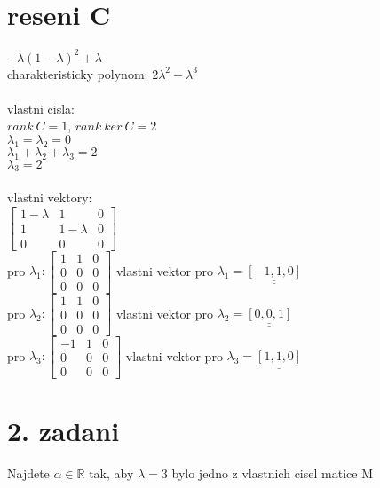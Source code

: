 \documentclass[a4paper]{article}
\def\doubleunderline#1{\underline{\underline{#1}}}
\begin{document}
\section*{reseni C}
$-\lambda(1-\lambda)^{2}+\lambda$\\
charakteristicky polynom: \doubleunderline{$2\lambda^2-\lambda^3$}\\
\\
vlastni cisla:\\
$rank~C = 1$, $rank~ker~C = 2$\\
\doubleunderline{$\lambda_1 = \lambda_2 = 0$}\\
$\lambda_1 + \lambda_2 + \lambda_3 = 2$\\
\doubleunderline{$\lambda_3 = 2$}\\
\\
vlastni vektory:\\
$
\left[\begin{matrix}
	1-\lambda & 1 & 0\\
	1 & 1-\lambda & 0\\
	0 & 0 & 0
	\end{matrix}\right]
$\\
pro $\lambda_1: \left[\begin{matrix}
	1 & 1 & 0\\
	0 & 0 & 0\\
	0 & 0 & 0
	\end{matrix}\right]$
vlastni vektor pro $\lambda_1 = \doubleunderline{[-1,1,0]}$\\
pro $\lambda_2: \left[\begin{matrix}
	1 & 1 & 0\\
	0 & 0 & 0\\
	0 & 0 & 0
	\end{matrix}\right]$
vlastni vektor pro $\lambda_2 = \doubleunderline{[0,0,1]}$\\
pro $\lambda_3: \left[\begin{matrix}
	-1 & 1 & 0\\
	0 & 0 & 0\\
	0 & 0 & 0
	\end{matrix}\right]$
vlastni vektor pro $\lambda_3 = \doubleunderline{[1,1,0]}$\\









\section*{2. zadani}
Najdete $\alpha \in \mathbb{R}$ tak, aby $\lambda = 3$
bylo jedno z vlastnich cisel matice M\\
\end{document}
